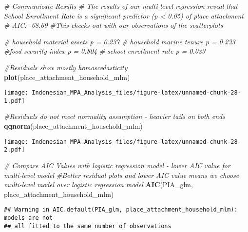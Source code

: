 \documentclass[
]{article}
\newenvironment{Shaded}{\begin{snugshade}}{\end{snugshade}}
\newcommand{\CommentTok}[1]{\textcolor[rgb]{0.56,0.35,0.01}{\textit{#1}}}
\newcommand{\FunctionTok}[1]{\textcolor[rgb]{0.13,0.29,0.53}{\textbf{#1}}}
\newcommand{\NormalTok}[1]{#1}
\begin{document}
\begin{Shaded}
\begin{Highlighting}[]
\CommentTok{\# Communicate Results}
\CommentTok{\# The results of our multi{-}level regression reveal that School Enrollment Rate is a significant predictor (p \textless{} 0.05) of place attachment}
\CommentTok{\# AIC: {-}68.69}
\CommentTok{\#This checks out with our observations of the scatterplots}

\CommentTok{\# household material assets p = 0.237}
\CommentTok{\# household marine tenure p = 0.233}
\CommentTok{\#food security index p = 0.804}
\CommentTok{\# school enrollment rate p  = 0.033}
\end{Highlighting}
\end{Shaded}

\begin{Shaded}
\begin{Highlighting}[]
\CommentTok{\#Residuals show mostly homoscedasticity }
\FunctionTok{plot}\NormalTok{(place\_attachment\_household\_mlm)}
\end{Highlighting}
\end{Shaded}

\texttt{[image: Indonesian\_MPA\_Analysis\_files/figure-latex/unnamed-chunk-28-1.pdf]}

\begin{Shaded}
\begin{Highlighting}[]
\CommentTok{\#Residuals do not meet normality assumption {-} heavier tails on both ends}
\FunctionTok{qqnorm}\NormalTok{(place\_attachment\_household\_mlm)}
\end{Highlighting}
\end{Shaded}

\texttt{[image: Indonesian\_MPA\_Analysis\_files/figure-latex/unnamed-chunk-28-2.pdf]}

\begin{Shaded}
\begin{Highlighting}[]
\CommentTok{\# Compare AIC Values with logistic regression model {-} lower AIC value for multi{-}level model}
\CommentTok{\#Better residual plots and lower AIC value means we choose multi{-}level model over logistic regression model}
\FunctionTok{AIC}\NormalTok{(PIA\_glm, place\_attachment\_household\_mlm)}
\end{Highlighting}
\end{Shaded}

\begin{verbatim}
## Warning in AIC.default(PIA_glm, place_attachment_household_mlm): models are not
## all fitted to the same number of observations
\end{verbatim}
\end{document}
